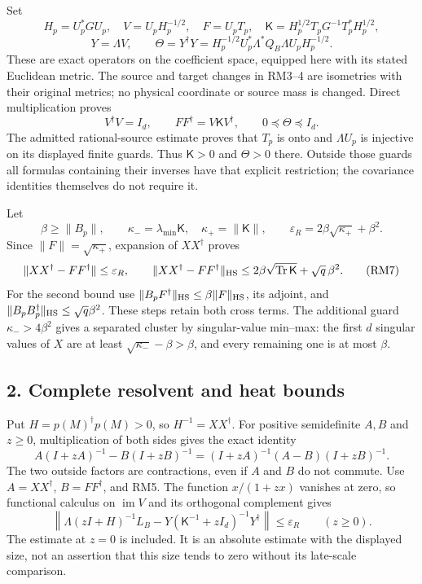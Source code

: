 \documentclass[11pt]{article}
\begin{document}
Set \[
H_p=U_p^*GU_p,\quad V=U_pH_p^{-1/2},\quad
F=U_pT_p,\quad
\mathsf K=H_p^{1/2}T_pG^{-1}T_p^*H_p^{1/2},
\tag{RM3}
\] \[
Y=\Lambda V,\qquad \Theta=Y^\dagger Y
=H_p^{-1/2}U_p^*\Lambda^*Q_B\Lambda U_pH_p^{-1/2}.
\tag{RM4}
\] These are exact operators on the coefficient space, equipped here with its stated Euclidean metric. The source and target changes in RM3--4 are isometries with their original metrics; no physical coordinate or source mass is changed. Direct multiplication proves \[
V^\dagger V=I_d,\qquad FF^\dagger=V\mathsf KV^\dagger,
\qquad 0\preceq\Theta\preceq I_d.
\tag{RM5}
\] The admitted rational-source estimate proves that \(T_p\) is onto and \(\Lambda U_p\) is injective on its displayed finite guards. Thus \(\mathsf K>0\) and \(\Theta>0\) there. Outside those guards all formulas containing their inverses have that explicit restriction; the covariance identities themselves do not require it.

Let \[
\beta\ge\|B_p\|,\qquad \kappa_-=\lambda_{\min}\mathsf K,
\quad\kappa_+=\|\mathsf K\|,\qquad
\varepsilon_R=2\beta\sqrt{\kappa_+}+\beta^2.
\tag{RM6}
\] Since \(\|F\|=\sqrt{\kappa_+}\), expansion of \(XX^\dagger\) proves \[
\|XX^\dagger-FF^\dagger\|\le\varepsilon_R,
\qquad
\|XX^\dagger-FF^\dagger\|_{\rm HS}
\le2\beta\sqrt{\operatorname{Tr}\mathsf K}+\sqrt q\,\beta^2.
\tag{RM7}
\] For the second bound use \(\|B_pF^\dagger\|_{\rm HS}\le\beta\|F\|_{\rm HS}\), its adjoint, and \(\|B_pB_p^\dagger\|_{\rm HS}\le\sqrt q\beta^2\). These steps retain both cross terms. The additional guard \(\kappa_->4\beta^2\) gives a separated cluster by singular-value min--max: the first \(d\) singular values of \(X\) are at least \(\sqrt{\kappa_-}-\beta>\beta\), and every remaining one is at most \(\beta\).

\subsection{2. Complete resolvent and heat bounds}\label{complete-resolvent-and-heat-bounds}

Put \(H=p(M)^\dagger p(M)>0\), so \(H^{-1}=XX^\dagger\). For positive semidefinite \(A,B\) and \(z\ge0\), multiplication of both sides gives the exact identity \[
A(I+zA)^{-1}-B(I+zB)^{-1}
=(I+zA)^{-1}(A-B)(I+zB)^{-1}.
\tag{RM8}
\] The two outside factors are contractions, even if \(A\) and \(B\) do not commute. Use \(A=XX^\dagger\), \(B=FF^\dagger\), and RM5. The function \(x/(1+zx)\) vanishes at zero, so functional calculus on \(\operatorname{im}V\) and its orthogonal complement gives \[
\left\|\Lambda(zI+H)^{-1}L_B
-Y(\mathsf K^{-1}+zI_d)^{-1}Y^\dagger\right\|
\le\varepsilon_R\qquad(z\ge0).
\tag{RM9}
\] The estimate at \(z=0\) is included. It is an absolute estimate with the displayed size, not an assertion that this size tends to zero without its late-scale comparison.
\end{document}

